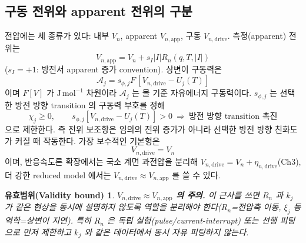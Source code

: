 \documentclass[11pt,a4paper]{article}
\newtheorem*{boundbox}{유효범위(Validity bound)}
\newcommand{\app}{\mathrm{app}}
\newcommand{\drive}{\mathrm{drive}}
\begin{document}
\subsection{구동 전위와 apparent 전위의 구분}
전압에는 세 종류가 있다: 내부 $V_n$, apparent $V_{n,\app}$, 구동 $V_{n,\drive}$. 측정(apparent) 전위는
\begin{equation}
V_{n,\app}=V_n+s_I|I|R_n(q,T,|I|)
\label{eq:Vapp}
\end{equation}
($s_I=+1$: 방전서 apparent 증가 convention). 상변이 구동력은
\begin{equation}
\mathcal A_j=s_{\phi,j}F\,[V_{n,\drive}-U_j(T)]
\label{eq:Aj}
\end{equation}
이며 $F[V]$ 가 $\mathrm{J\,mol^{-1}}$ 차원이라 $\mathcal A_j$ 는 몰 기준 자유에너지 구동력이다.
$s_{\phi,j}$ 는 선택한 방전 방향 transition 의 구동력 부호를 정해
\begin{equation}
\chi_j\ge0,\qquad s_{\phi,j}[V_{n,\drive}-U_j(T)]>0\ \Rightarrow\ \text{방전 방향 transition 촉진}
\label{eq:signrule}
\end{equation}
으로 제한한다. 즉 전위 보조항은 임의의 전위 증가가 아니라 선택한 방전 방향 친화도가 커질 때 작동한다.
가장 보수적인 기본형은
\begin{equation}
V_{n,\drive}=V_n
\label{eq:drive_basic}
\end{equation}
이며, 반응속도론 확장에서는 국소 계면 과전압을 분리해 $V_{n,\drive}=V_n+\eta_{n,\drive}$(Ch3), 더 강한
reduced model 에서는 $V_{n,\drive}\approx V_{n,\app}$ 를 쓸 수 있다.
\begin{boundbox}
\textbf{$V_{n,\drive}\approx V_{n,\app}$ 의 주의.} 이 근사를 쓰면 $R_n$ 과 $k_j$ 가 같은 현상을 동시에
설명하지 않도록 역할을 분리해야 한다($R_n$=전압축 이동, $\xi_j$ 동역학=상변이 지연). 특히 $R_n$ 은
독립 실험(pulse/current-interrupt) 또는 선행 피팅으로 먼저 제한하고 $k_j$ 와 같은 데이터에서 동시
자유 피팅하지 않는다.
\end{boundbox}
\end{document}
